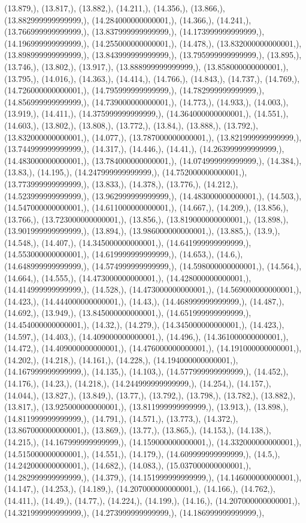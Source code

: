 \documentclass{article}
\begin{document}
(13.879,), (13.817,), (13.882,), (14.211,), (14.356,), (13.866,), (13.882999999999999,), (14.284000000000001,), (14.366,), (14.241,), (13.766999999999999,), (13.837999999999999,), (14.173999999999999,), (14.196999999999999,), (14.255000000000001,), (14.478,), (13.832000000000001,), (13.898999999999999,), (13.843999999999999,), (13.795999999999999,), (13.895,), (13.746,), (13.802,), (13.917,), (13.888999999999999,), (13.858000000000001,), (13.795,), (14.016,), (14.363,), (14.414,), (14.766,), (14.843,), (14.737,), (14.769,), (14.726000000000001,), (14.795999999999999,), (14.782999999999999,), (14.856999999999999,), (14.739000000000001,), (14.773,), (14.933,), (14.003,), (13.919,), (14.411,), (14.375999999999999,), (14.364000000000001,), (14.551,), (14.603,), (13.802,), (13.808,), (13.772,), (13.84,), (13.888,), (13.792,), (13.832000000000001,), (14.077,), (13.787000000000001,), (13.821999999999999,), (13.744999999999999,), (14.317,), (14.446,), (14.41,), (14.263999999999999,), (14.483000000000001,), (13.784000000000001,), (14.074999999999999,), (14.384,), (13.83,), (14.195,), (14.247999999999999,), (14.752000000000001,), (13.773999999999999,), (13.833,), (14.378,), (13.776,), (14.212,), (14.523999999999999,), (13.962999999999999,), (14.483000000000001,), (14.503,), (14.547000000000001,), (14.611000000000001,), (14.667,), (14.209,), (13.856,), (13.766,), (13.723000000000001,), (13.856,), (13.819000000000001,), (13.898,), (13.901999999999999,), (13.894,), (13.986000000000001,), (13.885,), (13.9,), (14.548,), (14.407,), (14.345000000000001,), (14.641999999999999,), (14.553000000000001,), (14.619999999999999,), (14.653,), (14.6,), (14.648999999999999,), (14.574999999999999,), (14.598000000000001,), (14.564,), (14.664,), (14.555,), (14.473000000000001,), (14.428000000000001,), (14.414999999999999,), (14.528,), (14.473000000000001,), (14.569000000000001,), (14.423,), (14.444000000000001,), (14.43,), (14.468999999999999,), (14.487,), (14.692,), (13.949,), (13.845000000000001,), (14.651999999999999,), (14.454000000000001,), (14.32,), (14.279,), (14.345000000000001,), (14.423,), (14.597,), (14.403,), (14.409000000000001,), (14.496,), (14.361000000000001,), (14.472,), (14.409000000000001,), (14.476000000000001,), (14.191000000000001,), (14.202,), (14.218,), (14.161,), (14.228,), (14.194000000000001,), (14.167999999999999,), (14.135,), (14.103,), (14.577999999999999,), (14.452,), (14.176,), (14.23,), (14.218,), (14.244999999999999,), (14.254,), (14.157,), (14.044,), (13.827,), (13.849,), (13.77,), (13.792,), (13.798,), (13.782,), (13.882,), (13.817,), (13.925000000000001,), (13.811999999999999,), (13.913,), (13.898,), (14.811999999999999,), (14.791,), (14.571,), (13.773,), (14.372,), (13.867000000000001,), (13.869,), (13.77,), (13.865,), (14.153,), (14.138,), (14.215,), (14.167999999999999,), (14.159000000000001,), (14.332000000000001,), (14.515000000000001,), (14.551,), (14.179,), (14.609999999999999,), (14.5,), (14.242000000000001,), (14.682,), (14.083,), (15.037000000000001,), (14.282999999999999,), (14.379,), (14.151999999999999,), (14.146000000000001,), (14.147,), (14.253,), (14.189,), (14.207000000000001,), (14.166,), (14.762,), (14.411,), (14.49,), (14.77,), (14.224,), (14.199,), (14.16,), (14.207000000000001,), (14.321999999999999,), (14.273999999999999,), (14.186999999999999,), 
\end{document}
